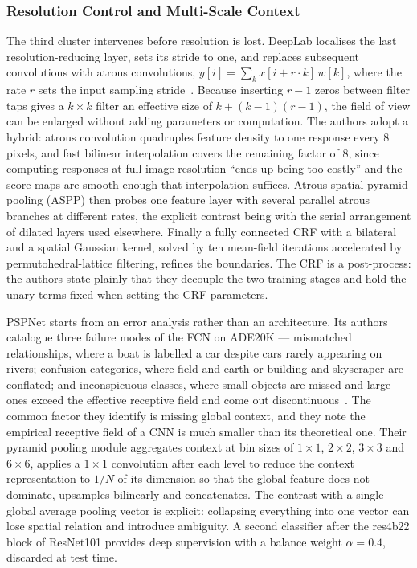 \documentclass[journal]{IEEEtran}
\begin{document}
\subsubsection{Resolution Control and Multi-Scale Context}
The third cluster intervenes before resolution is lost. DeepLab localises the last
resolution-reducing layer, sets its stride to one, and replaces subsequent
convolutions with atrous convolutions, $y[i]=\sum_k x[i+r\cdot k]\,w[k]$, where the
rate $r$ sets the input sampling stride~\cite{chen2016deeplab}. Because inserting
$r-1$ zeros between filter taps gives a $k\times k$ filter an effective size of
$k+(k-1)(r-1)$, the field of view can be enlarged without adding parameters or
computation. The authors adopt a hybrid: atrous convolution quadruples feature
density to one response every 8 pixels, and fast bilinear interpolation covers the
remaining factor of 8, since computing responses at full image resolution ``ends up
being too costly'' and the score maps are smooth enough that interpolation suffices.
Atrous spatial pyramid pooling (ASPP) then probes one feature layer with several
parallel atrous branches at different rates, the explicit contrast being with the
serial arrangement of dilated layers used elsewhere. Finally a fully connected CRF
with a bilateral and a spatial Gaussian kernel, solved by ten mean-field iterations
accelerated by permutohedral-lattice filtering, refines the boundaries. The CRF is a
post-process: the authors state plainly that they decouple the two training stages and
hold the unary terms fixed when setting the CRF parameters.

PSPNet starts from an error analysis rather than an architecture. Its authors catalogue
three failure modes of the FCN on ADE20K --- mismatched relationships, where a boat is
labelled a car despite cars rarely appearing on rivers; confusion categories, where
field and earth or building and skyscraper are conflated; and inconspicuous classes,
where small objects are missed and large ones exceed the effective receptive field and
come out discontinuous~\cite{zhao2016pspnet}. The common factor they identify is
missing global context, and they note the empirical receptive field of a CNN is much
smaller than its theoretical one. Their pyramid pooling module aggregates context at
bin sizes of $1\times1$, $2\times2$, $3\times3$ and $6\times6$, applies a $1\times1$
convolution after each level to reduce the context representation to $1/N$ of its
dimension so that the global feature does not dominate, upsamples bilinearly and
concatenates. The contrast with a single global average pooling vector is explicit:
collapsing everything into one vector can lose spatial relation and introduce
ambiguity. A second classifier after the res4b22 block of ResNet101 provides deep
supervision with a balance weight $\alpha=0.4$, discarded at test time.
\end{document}
